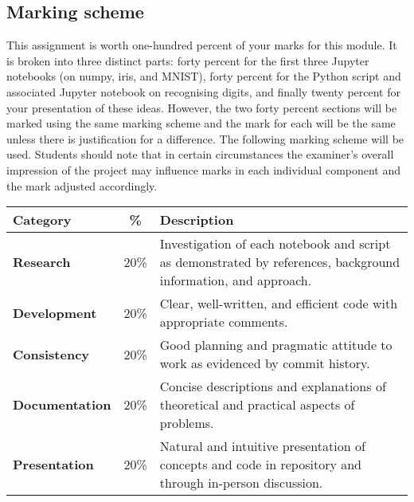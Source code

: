 \documentclass[12pt, a4paper]{article}
\begin{document}
\subsection*{Marking scheme}
This assignment is worth one-hundred percent of your marks for this module.
It is broken into three distinct parts: forty percent for the first three Jupyter notebooks (on numpy, iris, and MNIST), forty percent for the Python script and associated Jupyter notebook on recognising digits, and finally twenty percent for your presentation of these ideas.
However, the two forty percent sections will be marked using the same marking scheme and the mark for each will be the same unless there is justification for a difference.
The following marking scheme will be used.
Students should note that in certain circumstances the examiner's overall impression of the project may influence marks in each individual component and the mark adjusted accordingly.

\begin{center}
  \begin{tabular}{lcp{8.6cm}}
    \toprule
    \textbf{Category}      & \textbf{\%} & \textbf{Description} \\
    \midrule
    \textbf{Research}      & 20\%   & Investigation of each notebook and script as demonstrated by references, background information, and approach. \\
    \textbf{Development}   & 20\%   & Clear, well-written, and efficient code with appropriate comments. \\
    \textbf{Consistency}   & 20\%   & Good planning and pragmatic attitude to work as evidenced by commit history. \\
    \textbf{Documentation} & 20\%   & Concise descriptions and explanations of theoretical and practical aspects of problems. \\
    \textbf{Presentation}  & 20\%   & Natural and intuitive presentation of concepts and code in repository and through in-person discussion. \\
    \midrule
    \bottomrule
  \end{tabular}
\end{center}
\end{document}
